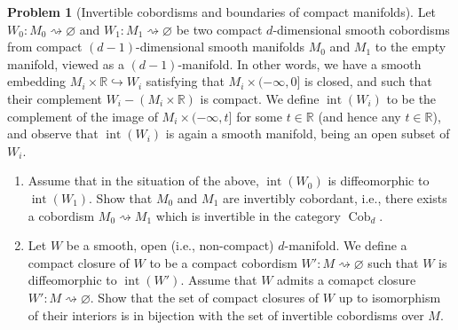 \documentclass[reqno]{amsart}
\theoremstyle{definition}
\newtheorem{problem}[theorem]{Problem}
\theoremstyle{remark}
\DeclareMathOperator{\Int}{int}
\DeclareMathOperator{\Cob}{Cob}
\begin{document}
    \begin{problem}[Invertible cobordisms and boundaries of
        compact manifolds]
        Let 
        $W_0 \colon M_0 \rightsquigarrow \varnothing $ and
        $W_1 \colon M_1 \rightsquigarrow \varnothing$ be
        two compact $d$-dimensional smooth cobordisms
        from compact $\left( d-1 \right) $-dimensional
        smooth manifolds $M_0$ and $M_1$ to the
        empty manifold, viewed as a 
        $\left( d-1 \right) $-manifold. In other words,
        we have a smooth embedding
        $M_i \times \mathbb{R} \hookrightarrow W_i$ satisfying
        that $M_i \times (-\infty, 0]$ is
        closed, and such that
        their complement 
        $W_i - \left( M_i \times \mathbb{R} \right) $ 
        is compact. We define
        $\Int \left( W_i \right) $ to
        be the complement of the image of
        $M_i \times (- \infty, t]$ for some $t \in \mathbb{R}$ 
        (and hence any $t \in \mathbb{R}$), and observe
        that $\Int \left( W_i \right) $ is again a
        smooth manifold, being an open subset of $W_i$.
        \begin{enumerate}
            \item Assume that in the situation of the
                above, $\Int (W_0)$ is diffeomorphic
                to $\Int \left( W_1 \right) $. Show that
                $M_0$ and $M_1$ are invertibly cobordant,
                i.e., there exists a cobordism
                $M_0 \rightsquigarrow M_1$ which is invertible
                in the category $\Cob_d$.
            \item Let $W$ be a smooth, open
                (i.e., non-compact) $d$-manifold. We define
                a compact closure of $W$ to be a compact
                cobordism $W' \colon
                M \rightsquigarrow \varnothing$ such that
                $W$ is diffeomorphic to 
                $\Int (W')$. Assume that $W$ admits
                a comapct closure $W' \colon M \rightsquigarrow
                \varnothing$. Show that the set of
                compact closures of $W$ up to isomorphism
                of their interiors is in bijection with the
                set of invertible cobordisms over $M$.
        \end{enumerate}
    \end{problem}
\end{document}
